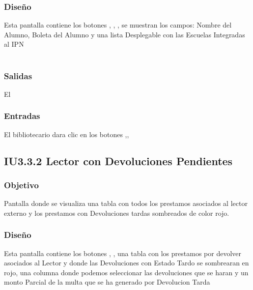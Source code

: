 \subsubsection{Diseño}
	Esta pantalla contiene los botones , , , se muestran los campos: Nombre del Alumno, Boleta del Alumno y una lista Desplegable con las Escuelas Integradas al IPN  \\\\


\subsubsection{Salidas}
	\begin{Citemize}
		\item El 
	\end{Citemize}
	
\subsubsection{Entradas}
	\begin{Citemize}
		\item El bibliotecario dara clic en los botones ,,\IUbutton{Devoluciones}
	\end{Citemize}

\newpage
\subsection{IU3.3.2 Lector con Devoluciones Pendientes}

\subsubsection{Objetivo}
	Pantalla donde se visualiza una tabla con todos los prestamos asociados al lector externo y los prestamos con Devoluciones tardas sombreados de color rojo. 

\subsubsection{Diseño}
	Esta pantalla contiene los botones , , una tabla con los prestamos por devolver asociados al Lector y donde las Devoluciones con Estado Tardo se sombrearan en rojo, una columna donde podemos seleccionar las devoluciones que se haran y un monto Parcial de la multa que se ha generado por Devolucion Tarda \\\\

